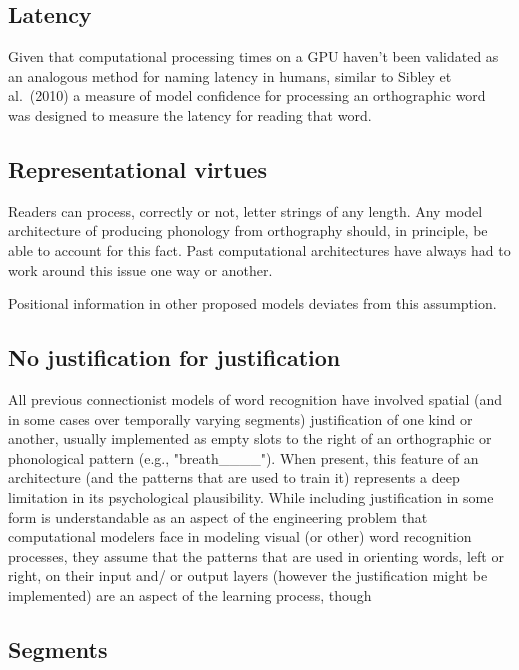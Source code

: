 \documentclass[
  american,
  man,floatsintext]{apa6}
\begin{document}
\hypertarget{latency}{%
\subsection{Latency}\label{latency}}

Given that computational processing times on a GPU haven't been validated as an analogous method for naming latency in humans, similar to Sibley et al.~(2010) a measure of model confidence for processing an orthographic word was designed to measure the latency for reading that word.

\hypertarget{representational-virtues}{%
\subsection{Representational virtues}\label{representational-virtues}}

Readers can process, correctly or not, letter strings of any length. Any model architecture of producing phonology from orthography should, in principle, be able to account for this fact. Past computational architectures have always had to work around this issue one way or another.

Positional information in other proposed models deviates from this assumption.

\hypertarget{no-justification-for-justification}{%
\subsection{No justification for justification}\label{no-justification-for-justification}}

All previous connectionist models of word recognition have involved spatial (and in some cases over temporally varying segments) justification of one kind or another, usually implemented as empty slots to the right of an orthographic or phonological pattern (e.g., "breath\_\_\_\_"). When present, this feature of an architecture (and the patterns that are used to train it) represents a deep limitation in its psychological plausibility. While including justification in some form is understandable as an aspect of the engineering problem that computational modelers face in modeling visual (or other) word recognition processes, they assume that the patterns that are used in orienting words, left or right, on their input and/ or output layers (however the justification might be implemented) are an aspect of the learning process, though

\hypertarget{segments}{%
\subsection{Segments}\label{segments}}
\end{document}
